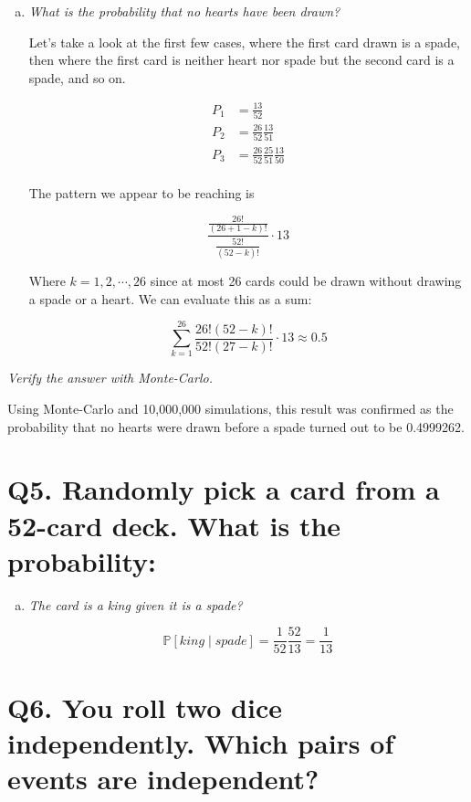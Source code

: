 \documentclass{article}
\begin{document}
\begin{enumerate}[(a)]
  \item \textit{What is the probability that no hearts have been drawn?}

    Let's take a look at the first few cases, where the first card drawn is a spade, then where the first card is neither heart nor spade but the second card is a spade, and so on.

    \begin{align*}
      P_1 &= \frac{13}{52} \\
      P_2 &= \frac{26}{52}\frac{13}{51} \\
      P_3 &= \frac{26}{52}\frac{25}{51}\frac{13}{50} \\
    \end{align*}

    The pattern we appear to be reaching is 

    $$\frac{\frac{26!}{(26+1-k)!}}{\frac{52!}{(52-k)!}}\cdot13$$

    Where $k = 1,2,\cdots,26$ since at most 26 cards could be drawn without drawing a spade or a heart. We can evaluate this as a sum:

    $$\sum_{k=1}^{26} \frac{26!(52-k)!}{52!(27-k)!}\cdot 13 \approx 0.5$$
\end{enumerate}

\textit{Verify the answer with Monte-Carlo.}

Using Monte-Carlo and 10,000,000 simulations, this result was confirmed as the probability that no hearts were drawn before a spade turned out to be 0.4999262.





\section*{Q5. \normalsize Randomly pick a card from a 52-card deck. What is the probability:}

\begin{enumerate}[(a)]
  \item \textit{The card is a king given it is a spade?}

    $$\mathbb{P}[king \mid spade] = \frac{1}{52}\frac{52}{13} = \frac{1}{13}$$
\end{enumerate}





\section*{Q6. \normalsize You roll two dice independently. Which pairs of events are independent?}
\end{document}
